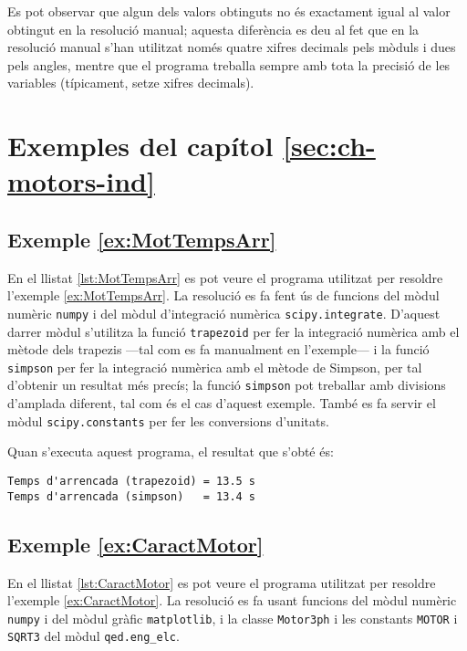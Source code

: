 Es pot observar que algun dels valors obtinguts no és exactament igual al valor obtingut en la resolució manual; aquesta diferència es deu  al fet que en la resolució manual s'han utilitzat només quatre xifres decimals pels mòduls i dues pels angles, mentre que el programa treballa sempre amb tota la precisió de les variables (típicament, setze xifres decimals).




\section{Exemples del capítol \ref*{sec:ch-motors-ind}}

\hypertarget{exemple:MotTempsArr}{\subsection{Exemple \ref*{ex:MotTempsArr} \MotTempsArr}}
En el llistat \vref{lst:MotTempsArr} es pot veure el programa utilitzat per resoldre l'exemple \vref{ex:MotTempsArr}. La resolució es fa fent ús de funcions del mòdul numèric \texttt{numpy} i del mòdul d'integració numèrica \texttt{scipy.integrate}. D'aquest darrer mòdul s'utilitza la funció \texttt{trapezoid} per fer la integració numèrica amb el mètode dels trapezis ---tal com es fa manualment en l'exemple--- i la funció \texttt{simpson} per fer la integració numèrica amb el mètode de Simpson, per tal d'obtenir un resultat més precís; la funció \texttt{simpson} pot treballar amb divisions d'amplada diferent, tal com és el cas d'aquest exemple. També es fa servir el mòdul \texttt{scipy.constants} per fer les conversions d'unitats.


Quan s'executa aquest programa, el resultat que s'obté és:
\lstset{
	language=,
	numbers=none,
	frame=none
}
\begin{lstlisting}
Temps d'arrencada (trapezoid) = 13.5 s
Temps d'arrencada (simpson)   = 13.4 s
\end{lstlisting} 


\hypertarget{exemple:CaractMotor}{\subsection{Exemple \ref*{ex:CaractMotor} \CaractMotor}}
En el llistat \vref{lst:CaractMotor} es pot veure el programa utilitzat per resoldre l'exemple \vref{ex:CaractMotor}. La resolució es fa usant funcions del mòdul numèric \texttt{numpy} i del mòdul gràfic \texttt{matplotlib}, i la classe \texttt{Motor3ph} i les constants \texttt{MOTOR} i \texttt{SQRT3} del mòdul \texttt{qed.eng\_elc}. 



